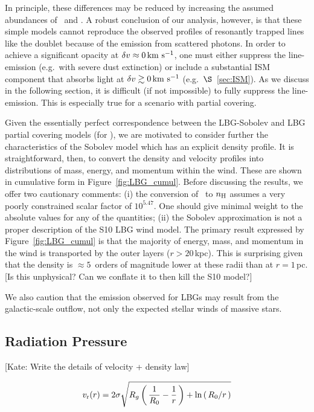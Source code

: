 \documentclass[12pt,preprint]{aastex}
\begin{document}
In principle, these differences may be reduced by increasing the
assumed abundances of \nmg\ and \nfe.  A robust conclusion of our
analysis, however, is that these simple models cannot reproduce the
observed profiles of resonantly trapped lines like the 
doublet because of the emission from scattered photons.  In order to
achieve a significant opacity at $\delta v \approx 0 \, {\rm km~s^{-1}}$, one must
either suppress the line-emission (e.g.\ with severe dust extinction) 
or include a substantial ISM component that absorbs light at $\delta v
\gtrsim 0 \, {\rm km~s^{-1}}$ (e.g.\ $\S$~\ref{sec:ISM}).  As we discuss in the
following section, it is difficult (if not impossible) to fully
suppress the line-emission.  This is especially true for a scenario
with partial covering.


Given the essentially perfect correspondence between the LBG-Sobolev and
LBG partial covering models (for \mgiia), we are motivated to consider
further the characteristics of the Sobolev model which has 
an explicit density profile.  It is straightforward, then, to convert the density and
velocity profiles into distributions of mass, energy, and momentum
within
the wind.  These are shown in cumulative form in
Figure~\ref{fig:LBG_cumul}.  Before discussing the results, we offer
two cautionary comments: (i) the conversion of \nmg\ to $n_{\rm H}$
assumes a very poorly constrained scalar factor of $10^{5.47}$.  One
should give minimal weight to the absolute values for any of the
quantities;
(ii) the Sobolev approximation is not a proper description of the S10
LBG wind model.
The primary result expressed by Figure~\ref{fig:LBG_cumul} is that the
majority of energy, mass, and momentum in the wind is transported by
the outer layers ($r > 20$\,kpc).  This is surprising given that the
density is $\approx 5$~orders of magnitude lower at these radii than
at $r = 1$\,pc.  [Is this unphysical?  Can we conflate it to then kill
the S10 model?]

We also caution that the  emission observed for LBGs
\citep[e.g.][]{cb58} may result from the galactic-scale outflow, not
only the expected stellar winds of massive stars.

\subsection{Radiation Pressure}

[Kate: Write the details of velocity + density law]

\begin{equation}
v_{\rm r}(r) = 2\sigma \sqrt{R_g \left ( \, \frac{1}{R_0} - \frac{1}{r} \, \right )
   + \ln\left ( \, R_0/r \, \right ) }
\end{equation}
\end{document}
